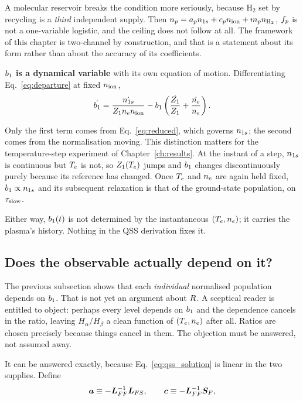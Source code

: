 A molecular reservoir breaks the condition more seriously, because
$\mathrm{H}_2$ set by recycling is a \emph{third} independent supply. Then
$n_p = a_pn_{1s} + c_pn_{\mathrm{ion}} + m_p n_{\mathrm{H}_2}$, $f_{p}$ is not a
one-variable logistic, and the ceiling does not follow at all. The framework of
this chapter is two-channel by construction, and that is a statement about its
form rather than about the accuracy of its coefficients.

\textbf{$b_1$ is a dynamical variable} with its own equation of motion.
Differentiating Eq.~\eqref{eq:departure} at fixed $n_{\mathrm{ion}}$,
\begin{equation}
  \dot{b_1}
  = \frac{\dot{n_{1s}}}{Z_{1}n_en_{\mathrm{ion}}}
  - b_1\left(\frac{\dot{Z_{1}}}{Z_{1}}
                + \frac{\dot{n_e}}{n_e}\right).
  \label{eq:b1_dynamics}
\end{equation}

\noindent Only the first term comes from Eq.~\eqref{eq:reduced}, which governs
$n_{1s}$; the second comes from the normalisation moving. This distinction matters
for the temperature-step experiment of Chapter~\ref{ch:results}. At the instant
of a step, $n_{1s}$ is continuous but $T_e$ is not, so $Z_{1}(T_e)$ jumps and
$b_1$ changes discontinuously purely because its reference has changed. Once
$T_e$ and $n_e$ are again held fixed, $b_1 \propto n_{1s}$ and its subsequent
relaxation is that of the ground-state population, on $\tau_{\mathrm{slow}}$.

Either way, $b_1(t)$ is not determined by the instantaneous $(T_e, n_e)$;
it carries the plasma's history. Nothing in the QSS derivation fixes it.

\subsection{Does the observable actually depend on it?}
\label{sec:R_depends_on_b}

The previous subsection shows that each \emph{individual} normalised population
depends on $b_1$. That is not yet an argument about $R$. A sceptical
reader is entitled to object: perhaps every level depends on $b_1$ and the
dependence cancels in the ratio, leaving $H_\alpha/H_\beta$ a clean function of
$(T_e,n_e)$ after all. Ratios are chosen precisely because things cancel in
them. The objection must be answered, not assumed away.

It can be answered exactly, because Eq.~\eqref{eq:qss_solution} is linear in the
two supplies. Define
\begin{equation}
  \bm{a} \equiv -\bm{L}_{FF}^{-1}\bm{L}_{FS},
  \qquad
  \bm{c} \equiv -\bm{L}_{FF}^{-1}\bm{S}_F ,
  \label{eq:ac_def}
\end{equation}

